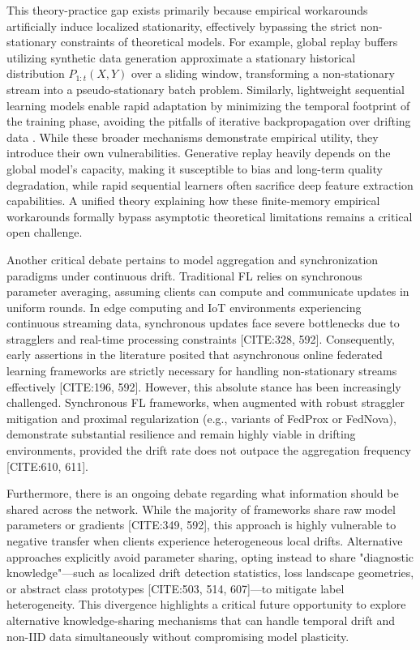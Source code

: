 \documentclass[journal]{IEEEtran}
\begin{document}
This theory-practice gap exists primarily because empirical workarounds artificially induce localized stationarity, effectively bypassing the strict non-stationary constraints of theoretical models. For example, global replay buffers utilizing synthetic data generation \cite{Miao2025} approximate a stationary historical distribution $P_{1:t}(X, Y)$ over a sliding window, transforming a non-stationary stream into a pseudo-stationary batch problem. Similarly, lightweight sequential learning models enable rapid adaptation by minimizing the temporal footprint of the training phase, avoiding the pitfalls of iterative backpropagation over drifting data \cite{Ito2021}. While these broader mechanisms demonstrate empirical utility, they introduce their own vulnerabilities. Generative replay heavily depends on the global model's capacity, making it susceptible to bias and long-term quality degradation, while rapid sequential learners often sacrifice deep feature extraction capabilities. A unified theory explaining how these finite-memory empirical workarounds formally bypass asymptotic theoretical limitations remains a critical open challenge.

Another critical debate pertains to model aggregation and synchronization paradigms under continuous drift. Traditional FL relies on synchronous parameter averaging, assuming clients can compute and communicate updates in uniform rounds. In edge computing and IoT environments experiencing continuous streaming data, synchronous updates face severe bottlenecks due to stragglers and real-time processing constraints [CITE:328, 592]. Consequently, early assertions in the literature posited that asynchronous online federated learning frameworks are strictly necessary for handling non-stationary streams effectively [CITE:196, 592]. However, this absolute stance has been increasingly challenged. Synchronous FL frameworks, when augmented with robust straggler mitigation and proximal regularization (e.g., variants of FedProx or FedNova), demonstrate substantial resilience and remain highly viable in drifting environments, provided the drift rate does not outpace the aggregation frequency [CITE:610, 611]. 

Furthermore, there is an ongoing debate regarding what information should be shared across the network. While the majority of frameworks share raw model parameters or gradients [CITE:349, 592], this approach is highly vulnerable to negative transfer when clients experience heterogeneous local drifts. Alternative approaches explicitly avoid parameter sharing, opting instead to share "diagnostic knowledge"—such as localized drift detection statistics, loss landscape geometries, or abstract class prototypes [CITE:503, 514, 607]—to mitigate label heterogeneity. This divergence highlights a critical future opportunity to explore alternative knowledge-sharing mechanisms that can handle temporal drift and non-IID data simultaneously without compromising model plasticity.
\end{document}
